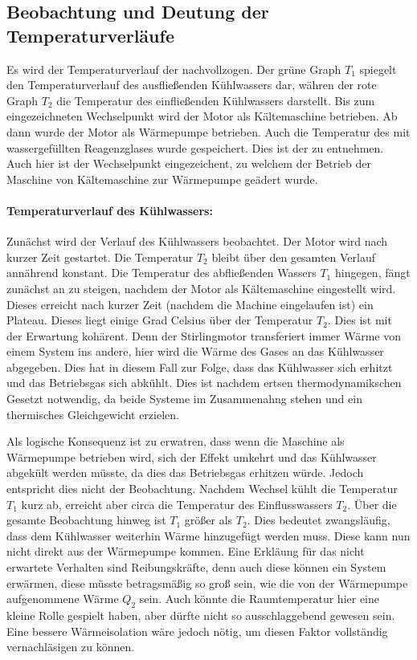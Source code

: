\subsection{Beobachtung und Deutung der Temperaturverläufe}
Es wird der Temperaturverlauf der  nachvollzogen. Der grüne Graph $T_1$ spiegelt den Temperaturverlauf des ausfließenden Kühlwassers dar, währen der rote Graph $T_2$ die Temperatur des einfließenden Kühlwassers darstellt. Bis zum eingezeichneten Wechselpunkt wird der Motor als Kältemaschine betrieben. Ab dann wurde der Motor als Wärmepumpe betrieben.
Auch die Temperatur des mit wassergefüllten Reagenzglases wurde gespeichert. Dies ist der  zu entnehmen. Auch hier ist der Wechselpunkt eingezeichent, zu welchem der Betrieb der Maschine von Kältemaschine zur Wärmepumpe geädert wurde.

\paragraph{Temperaturverlauf des Kühlwassers:}
Zunächst wird der Verlauf des Kühlwassers beobachtet. Der Motor wird nach kurzer Zeit gestartet. Die Temperatur $T_2$ bleibt über den gesamten Verlauf annährend konstant. Die Temperatur des abfließenden Wassers $T_1$ hingegen, fängt zunächst an zu steigen, nachdem der Motor als Kältemaschine eingestellt wird. Dieses erreicht nach kurzer Zeit (nachdem die Machine eingelaufen ist) ein Plateau. Dieses liegt einige Grad Celsius über der Temperatur $T_2$. 
Dies ist mit der Erwartung kohärent. Denn der Stirlingmotor transferiert immer Wärme von einem System ins andere, hier wird die Wärme des Gases an das Kühlwasser abgegeben. Dies hat in diesem Fall zur Folge, dass das Kühlwasser sich erhitzt und das Betriebsgas sich abkühlt. Dies ist nachdem ertsen thermodynamikschen Gesetzt notwendig, da beide Systeme im Zusammenahng stehen und ein thermisches Gleichgewicht erzielen. 

Als logische Konsequenz ist zu erwatren, dass wenn die Maschine als Wärmepumpe betrieben wird, sich der Effekt umkehrt und das Kühlwasser abgekült werden müsste, da dies das Betriebsgas erhitzen würde.
Jedoch entspricht dies nicht der Beobachtung. Nachdem Wechsel kühlt die Temperatur $T_1$ kurz ab, erreicht aber circa die Temperatur des Einflusswassers $T_2$. Über die gesamte Beobachtung hinweg ist $T_1$ größer als $T_2$. Dies bedeutet zwangsläufig, dass dem Kühlwasser weiterhin Wärme hinzugefügt werden muss. Diese kann nun nicht direkt aus der Wärmepumpe kommen.
Eine Erkläung für das nicht erwartete Verhalten sind Reibungskräfte, denn auch diese können ein System erwärmen, diese müsste betragsmäßig so groß sein, wie die von der Wärmepumpe aufgenommene Wärme $Q_2$ sein. Auch könnte die Raumtemperatur hier eine kleine Rolle gespielt haben, aber dürfte nicht so ausschlaggebend gewesen sein. Eine bessere Wärmeisolation wäre jedoch nötig, um diesen Faktor vollständig vernachläsigen zu können. 

